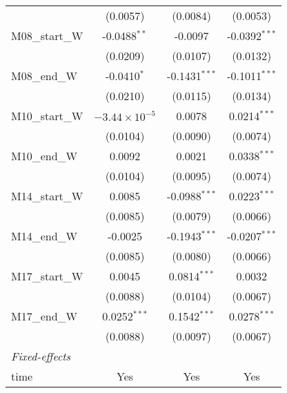 \documentclass[10pt,a4paper]{article}
\begin{document}
\begin{tabular}{l c c c}
                                                    & (0.0057)				& (0.0084)					& (0.0053)\\    
   M08\_start\_W                                    & -0.0488$^{**}$			& -0.0097					& -0.0392$^{***}$\\   
                                                    & (0.0209)				& (0.0107)					& (0.0132)\\   
   M08\_end\_W                                      & -0.0410$^{*}$			& -0.1431$^{***}$			& -0.1011$^{***}$\\    
                                                    & (0.0210)				& (0.0115)					& (0.0134)\\   
   M10\_start\_W                                    & $-3.44\times 10^{-5}$	& 0.0078					& 0.0214$^{***}$\\  
                                                    & (0.0104)				& (0.0090)					& (0.0074)\\    
   M10\_end\_W                                      & 0.0092					& 0.0021					& 0.0338$^{***}$\\    
                                                    & (0.0104)				& (0.0095)					& (0.0074)\\   
   M14\_start\_W                                    & 0.0085					& -0.0988$^{***}$			& 0.0223$^{***}$\\  
                                                    & (0.0085)				& (0.0079)					& (0.0066)\\  
   M14\_end\_W                                      & -0.0025				& -0.1943$^{***}$			& -0.0207$^{***}$\\     
                                                    & (0.0085)				&(0.0080)					& (0.0066)\\   
   M17\_start\_W                                    & 0.0045					& 0.0814$^{***}$			& 0.0032\\
                                                    & (0.0088)				& (0.0104)					& (0.0067)\\   
   M17\_end\_W                                      & 0.0252$^{***}$			& 0.1542$^{***}$			& 0.0278$^{***}$\\   
                                                    & (0.0088)				& (0.0097)					& (0.0067)\\   
   \midrule
   \emph{Fixed-effects}\\
   time                                             & Yes 					& Yes						& Yes\\  

\end{tabular}
\end{document}
